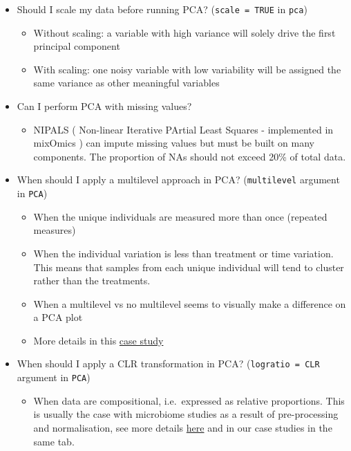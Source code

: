 \documentclass[]{book}
\providecommand{\tightlist}{%
  \setlength{\itemsep}{0pt}\setlength{\parskip}{0pt}}
\theoremstyle{definition}
\theoremstyle{definition}
\theoremstyle{definition}
\theoremstyle{remark}
\begin{document}
\begin{itemize}
\tightlist
\item
  Should I scale my data before running PCA? (\texttt{scale\ =\ TRUE} in
  \texttt{pca})

  \begin{itemize}
  \tightlist
  \item
    Without scaling: a variable with high variance will solely drive the
    first principal component
  \item
    With scaling: one noisy variable with low variability will be
    assigned the same variance as other meaningful variables
  \end{itemize}
\item
  Can I perform PCA with missing values?

  \begin{itemize}
  \tightlist
  \item
    NIPALS ( Non-linear Iterative PArtial Least Squares - implemented in
    mixOmics ) can impute missing values but must be built on many
    components. The proportion of NAs should not exceed 20\% of total
    data.
  \end{itemize}
\item
  When should I apply a multilevel approach in PCA? (\texttt{multilevel}
  argument in \texttt{PCA})

  \begin{itemize}
  \tightlist
  \item
    When the unique individuals are measured more than once (repeated
    measures)
  \item
    When the individual variation is less than treatment or time
    variation. This means that samples from each unique individual will
    tend to cluster rather than the treatments.
  \item
    When a multilevel vs no multilevel seems to visually make a
    difference on a PCA plot
  \item
    More details in this
    \href{http://mixomics.org/case-studies/multilevel-vac18/}{case
    study}
  \end{itemize}
\item
  When should I apply a CLR transformation in PCA?
  (\texttt{logratio\ =\ \textquotesingle{}CLR\textquotesingle{}}
  argument in \texttt{PCA})

  \begin{itemize}
  \tightlist
  \item
    When data are compositional, i.e.~expressed as relative proportions.
    This is usually the case with microbiome studies as a result of
    pre-processing and normalisation, see more details
    \href{http://mixomics.org/mixmc/}{here} and in our case studies in
    the same tab.
  \end{itemize}
\end{itemize}
\end{document}
